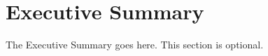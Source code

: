 
\chapter*{Executive Summary}
\label{sec:execsummary}



The	Executive Summary goes here.  This section is optional.

